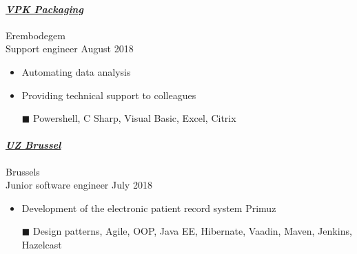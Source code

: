 \documentclass[a4paper, twoside]{article}
\begin{document}
\paragraph{\textbf{\textit{\href{https://vpkgroup.com }{\textcolor{blueDark}{ VPK Packaging }}}}} \hfill\small Erembodegem \\
Support engineer \hfill\small
August 2018
\begin{itemize}
\itemsep-0.2em
\item Automating data analysis
\item Providing technical support to colleagues
\item[\color{orange}$\blacksquare$] Powershell, C Sharp, Visual Basic, Excel, Citrix
\end{itemize}
\paragraph{\textbf{\textit{\href{https://uzbrussel.be }{\textcolor{blueDark}{ UZ Brussel }}}}} \hfill\small Brussels \\
Junior software engineer \hfill\small
July 2018
\begin{itemize}
\itemsep-0.2em
\item Development of the electronic patient record system Primuz
\item[\color{orange}$\blacksquare$] Design patterns, Agile, OOP, Java EE, Hibernate, Vaadin, Maven, Jenkins, Hazelcast
\end{itemize}
\end{document}
